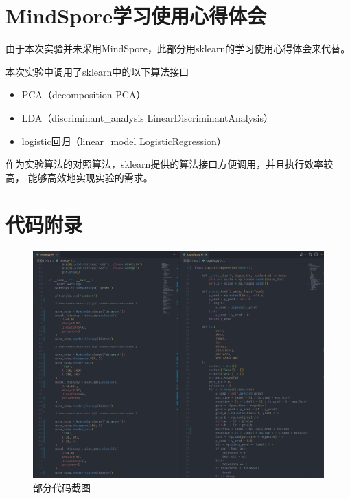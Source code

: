 \documentclass[notitlepage]{article}
\begin{document}
\section{MindSpore学习使用心得体会}

由于本次实验并未采用MindSpore，此部分用sklearn的学习使用心得体会来代替。

本次实验中调用了sklearn中的以下算法接口

\begin{itemize}
    \item PCA（decomposition PCA）
    \item LDA（discriminant\_analysis LinearDiscriminantAnalysis）
    \item logistic回归（linear\_model LogisticRegression）
\end{itemize}

作为实验算法的对照算法，sklearn提供的算法接口方便调用，并且执行效率较高，
能够高效地实现实验的需求。

\newpage

\section{代码附录}

\begin{figure}[h]
    \centering
    \includegraphics*[width=\columnwidth]{../imgs/code.png}
    \caption{部分代码截图}
\end{figure}
\end{document}
